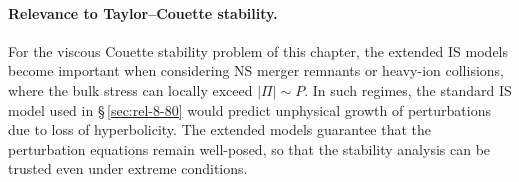 \paragraph{Relevance to Taylor--Couette stability.}
For the viscous Couette stability problem of this chapter, the
extended IS models become important when considering NS merger remnants
or heavy-ion collisions, where the bulk stress can locally exceed
$|{\Pi}| \sim P$.  In such regimes, the standard IS model used in
\S\,\ref{sec:rel-8-80} would predict unphysical growth of
perturbations due to loss of hyperbolicity.  The extended models
guarantee that the perturbation equations remain well-posed, so that
the stability analysis can be trusted even under extreme conditions.
